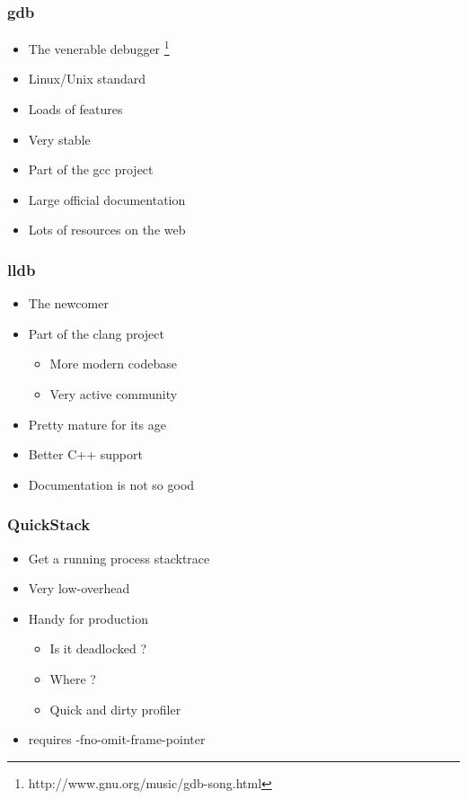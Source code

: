\begin{frame}
  \frametitle{gdb}

  \begin{itemize}
  \item The venerable debugger \footnote{http://www.gnu.org/music/gdb-song.html}
  \item Linux/Unix standard
  \item Loads of features
  \item Very stable
  \item Part of the gcc project
  \item Large official documentation
  \item Lots of resources on the web
  \end{itemize}
\end{frame}


\begin{frame}
  \frametitle{lldb}

  \begin{itemize}
  \item The newcomer
  \item Part of the clang project
    \begin{itemize}
    \item More modern codebase
    \item Very active community
    \end{itemize}
  \item Pretty mature for its age
  \item Better C++ support
  \item Documentation is not so good
  \end{itemize}
\end{frame}


\begin{frame}
  \frametitle{QuickStack}

  \begin{itemize}
  \item Get a running process stacktrace
  \item Very low-overhead
  \item Handy for production
    \begin{itemize}
    \item Is it deadlocked ?
    \item Where ?
    \item Quick and dirty profiler
    \end{itemize}
  \item requires -fno-omit-frame-pointer
  \end{itemize}
\end{frame}


